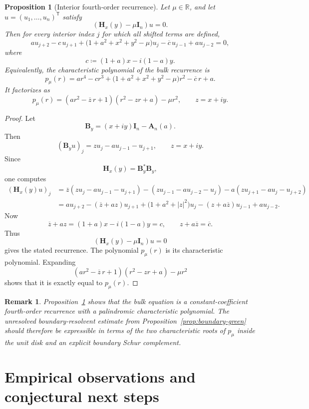 \documentclass[11pt]{article}
\newtheorem{proposition}[theorem]{Proposition}
\newtheorem{remark}[theorem]{Remark}
\begin{document}
\begin{proposition}[Interior fourth-order recurrence]\label{prop:bulk-recurrence}
Let \(\mu\in\mathbb R\), and let \(u=(u_1,\dots,u_n)^{\mathsf T}\) satisfy
\[
(\mathbf H_x(y)-\mu\mathbf I_n)u=0.
\]
Then for every interior index \(j\) for which all shifted terms are defined,
\[
a u_{j+2}
-c\,u_{j+1}
+
\bigl(1+a^2+x^2+y^2-\mu\bigr)u_j
-\overline c\,u_{j-1}
+a u_{j-2}
=0,
\]
where
\[
c\coloneqq (1+a)x-i(1-a)y.
\]
Equivalently, the characteristic polynomial of the bulk recurrence is
\[
p_\mu(r)
=
a r^4-c r^3+\bigl(1+a^2+x^2+y^2-\mu\bigr)r^2-\overline c\,r+a.
\]
It factorizes as
\[
\boxed{
p_\mu(r)
=
(ar^2-\overline z\,r+1)(r^2-zr+a)-\mu r^2,
\qquad
z=x+iy.
}
\]
\end{proposition}

\begin{proof}
Let
\[
\mathbf B_y=(x+iy)\mathbf I_n-\mathbf A_n(a).
\]
Then
\[
(\mathbf B_y u)_j
=
zu_j-a u_{j-1}-u_{j+1},
\qquad z=x+iy.
\]
Since
\[
\mathbf H_x(y)=\mathbf B_y^*\mathbf B_y,
\]
one computes
\begin{align*}
(\mathbf H_x(y)u)_j
&=
\overline z(zu_j-a u_{j-1}-u_{j+1})
-(zu_{j-1}-a u_{j-2}-u_j)
-a(zu_{j+1}-a u_j-u_{j+2}) \\
&=
a u_{j+2}
-(\overline z+a z)u_{j+1}
+\bigl(1+a^2+|z|^2\bigr)u_j
-(z+a\overline z)u_{j-1}
+a u_{j-2}.
\end{align*}
Now
\[
\overline z+a z=(1+a)x-i(1-a)y=c,
\qquad
z+a\overline z=\overline c.
\]
Thus
\[
(\mathbf H_x(y)-\mu\mathbf I_n)u=0
\]
gives the stated recurrence. The polynomial \(p_\mu(r)\) is its characteristic polynomial. Expanding
\[
(ar^2-\overline z\,r+1)(r^2-zr+a)-\mu r^2
\]
shows that it is exactly equal to \(p_\mu(r)\).
\end{proof}

\begin{remark}
Proposition~\ref{prop:bulk-recurrence} shows that the bulk equation is a constant-coefficient fourth-order recurrence with a palindromic characteristic polynomial.  The unresolved boundary-resolvent estimate from Proposition~\ref{prop:boundary-green} should therefore be expressible in terms of the two characteristic roots of \(p_\mu\) inside the unit disk and an explicit boundary Schur complement.
\end{remark}

\section{Empirical observations and conjectural next steps}
\end{document}
